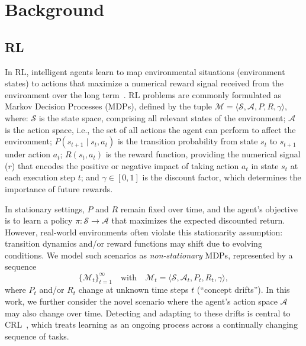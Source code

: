 
\section{Background}
\label{sec:background}

\subsection{\acl{RL}}

In \ac{RL}, intelligent agents learn to map environmental situations (environment states) to actions that maximize a numerical reward signal received from the environment over the long term~\cite{sutton18}. \ac{RL} problems are commonly formulated as Markov Decision Processes (MDPs), defined by the tuple $\mathcal{M} = \langle \mathcal{S}, \mathcal{A}, P, R, \gamma \rangle$, where:
$\mathcal{S}$ is the state space, comprising all relevant states of the environment;
$\mathcal{A}$ is the action space, i.e., the set of all actions the agent can perform to affect the environment;
$P(s_{t+1} \mid s_t, a_t)$ is the transition probability from state {\color{purple}$s_t$} to {\color{purple}$s_{t+1}$} under action {\color{purple}$a_t$};
$R(s_t, a_t)$ is the reward function, providing the numerical signal ($r$) that encodes the positive or negative impact of taking action {\color{purple}$a_t$} in state {\color{purple}$s_t$} at each execution step $t$; and $\gamma \in [0, 1]$ is the discount factor, which determines the importance of future rewards.

In stationary settings, $P$ and $R$ remain fixed over time, and the agent’s objective is to learn a policy $\pi: \mathcal{S} \to \mathcal{A}$ that maximizes the expected discounted return. However, real-world environments often violate this stationarity assumption: transition dynamics and/or reward functions may shift due to evolving conditions. We model such scenarios as \emph{non-stationary} MDPs, represented by a sequence
\[
\{\mathcal{M}_t\}_{t=1}^\infty
\quad\text{with}\quad
\mathcal{M}_t = \bigl\langle \mathcal{S}, \mathcal{A}_t, P_t, R_t, \gamma \bigr\rangle,
\]
where $P_t$ and/or $R_t$ change at unknown time steps $t$ (``concept drifts''). In this work, we further consider the novel scenario where the agent's action space $\mathcal{A}$ may also change over time. Detecting and adapting to these drifts is central to \ac{CRL}~\cite{khetarpal2022continualreinforcementlearningreview,abel2023definitioncontinualreinforcementlearning}, which treats learning as an ongoing process across a continually changing sequence of tasks.

